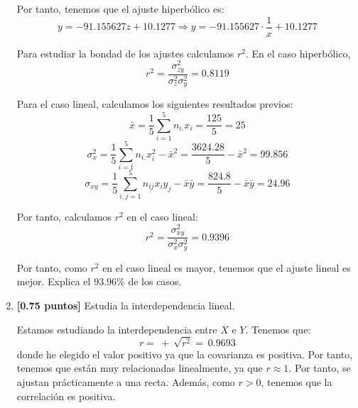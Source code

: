 \documentclass[12pt]{article}
\begin{document}
\begin{ejercicio}
\begin{enumerate}
        Por tanto, tenemos que el ajuste hiperbólico es:
        \begin{equation*}
            y=-91.155627z+10.1277 \Longrightarrow y=-91.155627\cdot \frac{1}{x}+10.1277
        \end{equation*}

        Para estudiar la bondad de los ajustes calculamos $r^2$. En el caso hiperbólico,
        \begin{equation*}
            r^2=\frac{\sigma_{zy}^2}{\sigma_z^2\sigma_y^2} = 0.8119
        \end{equation*}

        Para el caso lineal, calculamos los siguientes resultados previos:
        \begin{equation*}
            \bar{x}=\frac{1}{5}\sum_{i=1}^5 n_{i.}x_i = \frac{125}{5}=25
        \end{equation*}
        \begin{equation*}
            \sigma_{x}^2=\frac{1}{5}\sum_{i=1}^5 n_{i.}x_i^2 -\bar{x}^2
            = \frac{3624.28}{5} -\bar{x}^2=99.856
        \end{equation*}
        \begin{equation*}
            \sigma_{xy}=\frac{1}{5}\sum_{i,j=1}^5 n_{ij}x_iy_j -\bar{x}\bar{y} = \frac{824.8}{5} -\bar{x}\bar{y}=24.96
        \end{equation*}

        Por tanto, calculamos $r^2$ en el caso lineal:
        \begin{equation*}
            r^2=\frac{\sigma_{xy}^2}{\sigma_x^2\sigma_y^2} = 0.9396
        \end{equation*}

        Por tanto, como $r^2$ en el caso lineal es mayor, tenemos que el ajuste lineal es mejor. Explica el $93.96\%$ de los casos.
        
        
        \item \textbf{[0.75 puntos]} Estudia la interdependencia lineal.

        Estamos estudiando la interdependencia entre $X$ e $Y$. Tenemos que: $$r=~+~\sqrt{r^2}=~0.9693$$donde he elegido el valor positivo ya que la covarianza es positiva. Por tanto, tenemos que están muy relacionadas linealmente, ya que $r\approx 1$. Por tanto, se ajustan prácticamente a una recta. Además, como $r>0$, tenemos que la correlación es positiva.
        
    \end{enumerate}
\end{ejercicio}
\end{document}
